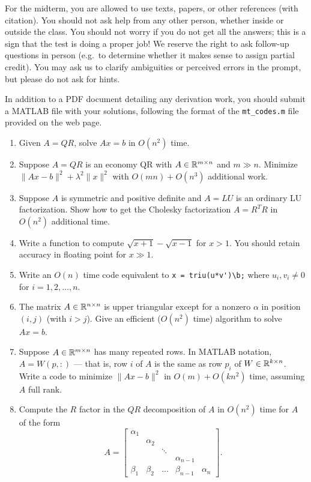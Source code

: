 \documentclass[12pt, leqno]{article}
\begin{document}

For the midterm, you are allowed to use texts, papers, or other
references (with citation).  You should not ask help from any other
person, whether inside or outside the class.  You should not worry if
you do not get all the answers; this is a sign that the test is doing
a proper job!  We reserve the right to ask follow-up questions in
person (e.g.~to determine whether it makes sense to assign partial
credit).  You may ask us to clarify ambiguities or perceived errors in
the prompt, but please do not ask for hints.

In addition to a PDF document detailing any derivation work,
you should submit a MATLAB file with your solutions, following
the format of the \verb|mt_codes.m| file provided on the web page.

\begin{enumerate}
  
\item Given $A = QR$, solve $Ax = b$ in $O(n^2)$ time.
    
\item Suppose $A = QR$ is an economy QR with $A \in \mathbb{R}^{m \times n}$
  and $m \gg n$.
  Minimize $\|Ax-b\|^2 + \lambda^2 \|x\|^2$ with
  $O(mn) + O(n^3)$ additional work.
    
\item Suppose $A$ is symmetric and positive definite and $A = LU$ is
  an ordinary LU factorization.  Show how to get the Cholesky
  factorization $A = R^T R$ in $O(n^2)$ additional time.

\item
  Write a function to compute $\sqrt{x+1}-\sqrt{x-1}$ for $x > 1$.
  You should retain accuracy in floating point for $x \gg 1$.

\item
  Write an $O(n)$ time code equivalent to \verb|x = triu(u*v')\b;| where
  $u_i, v_i \neq 0$ for $i=1,2,\ldots,n$.

\item
  The matrix $A \in \mathbb{R}^{n \times n}$ is upper triangular except for
  a nonzero $\alpha$ in position $(i,j)$ (with $i > j$).  Give an efficient
  ($O(n^2)$ time) algorithm to solve $Ax = b$.

\item
  Suppose $A \in \mathbb{R}^{m \times n}$ has many repeated rows.  In MATLAB
  notation, $A = W(p,:)$ --- that is, row $i$ of $A$ is the same as
  row $p_i$ of $W \in \mathbb{R}^{k \times n}$. Write a code to minimize
  $\|Ax-b\|^2$ in $O(m) + O(k n^2)$ time, assuming $A$ full rank.
  
\item
  Compute the $R$ factor in the $QR$
  decomposition of $A$ in $O(n^2)$ time for $A$ of the form
  \[
  A = \begin{bmatrix}
    \alpha_1 \\
    & \alpha_2  \\
    & & \ddots \\
    & & & \alpha_{n-1} &  \\
    \beta_1 & \beta_2 & \ldots & \beta_{n-1} & \alpha_n
  \end{bmatrix}.
  \]

\end{enumerate}
\end{document}

